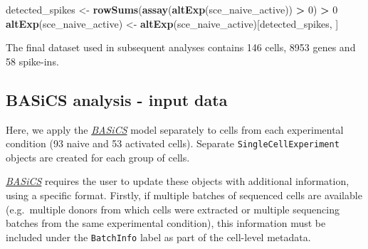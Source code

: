 \documentclass[9pt,a4paper,]{extarticle}
\newenvironment{Shaded}{\begin{snugshade}}{\end{snugshade}}
\newcommand{\DecValTok}[1]{\textcolor[rgb]{0.00,0.00,0.81}{#1}}
\newcommand{\KeywordTok}[1]{\textcolor[rgb]{0.13,0.29,0.53}{\textbf{#1}}}
\newcommand{\NormalTok}[1]{#1}
\newcommand{\OperatorTok}[1]{\textcolor[rgb]{0.81,0.36,0.00}{\textbf{#1}}}
\newcommand{\StringTok}[1]{\textcolor[rgb]{0.31,0.60,0.02}{#1}}
\begin{document}
\begin{Shaded}
\begin{Highlighting}[]
\NormalTok{detected_spikes <-}\StringTok{ }\KeywordTok{rowSums}\NormalTok{(}\KeywordTok{assay}\NormalTok{(}\KeywordTok{altExp}\NormalTok{(sce_naive_active)) }\OperatorTok{>}\StringTok{ }\DecValTok{0}\NormalTok{) }\OperatorTok{>}\StringTok{ }\DecValTok{0}
\KeywordTok{altExp}\NormalTok{(sce_naive_active) <-}\StringTok{ }\KeywordTok{altExp}\NormalTok{(sce_naive_active)[detected_spikes, ]}
\end{Highlighting}
\end{Shaded}

The final dataset used in subsequent analyses contains 146
cells, 8953 genes and 58 spike-ins.

\hypertarget{basics-analysis---input-data}{%
\subsection{BASiCS analysis - input data}\label{basics-analysis---input-data}}

Here, we apply the \emph{\href{https://bioconductor.org/packages/3.11/BASiCS}{BASiCS}} model separately to cells from each
experimental condition (93
naive and 53 activated cells).
Separate \texttt{SingleCellExperiment} objects are created for each group of cells.

\begin{Shaded}
\end{Shaded}

\emph{\href{https://bioconductor.org/packages/3.11/BASiCS}{BASiCS}} requires the user to update these objects with additional
information, using a specific format.
Firstly, if multiple batches of sequenced cells are available (e.g.~multiple
donors from which cells were extracted or multiple sequencing batches from the
same experimental condition), this information must be included under the
\texttt{BatchInfo} label as part of the cell-level metadata.

\begin{Shaded}
\end{Shaded}
\end{document}
